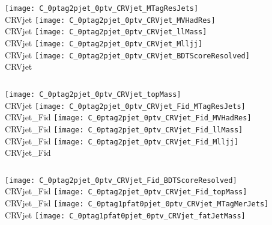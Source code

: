 \begin{frame}{}
  \begin{columns}[c]
    \centering\texttt{[image: C\_0ptag2pjet\_0ptv\_CRVjet\_MTagResJets]}\\
    CRVjet
    \centering\texttt{[image: C\_0ptag2pjet\_0ptv\_CRVjet\_MVHadRes]}\\
    CRVjet
    \centering\texttt{[image: C\_0ptag2pjet\_0ptv\_CRVjet\_llMass]}\\
    CRVjet
    \centering\texttt{[image: C\_0ptag2pjet\_0ptv\_CRVjet\_Mlljj]}\\
    CRVjet
    \centering\texttt{[image: C\_0ptag2pjet\_0ptv\_CRVjet\_BDTScoreResolved]}\\
    CRVjet
  \end{columns}
  \begin{columns}[c]
    \centering\texttt{[image: C\_0ptag2pjet\_0ptv\_CRVjet\_topMass]}\\
    CRVjet
    \centering\texttt{[image: C\_0ptag2pjet\_0ptv\_CRVjet\_Fid\_MTagResJets]}\\
    CRVjet\_Fid
    \centering\texttt{[image: C\_0ptag2pjet\_0ptv\_CRVjet\_Fid\_MVHadRes]}\\
    CRVjet\_Fid
    \centering\texttt{[image: C\_0ptag2pjet\_0ptv\_CRVjet\_Fid\_llMass]}\\
    CRVjet\_Fid
    \centering\texttt{[image: C\_0ptag2pjet\_0ptv\_CRVjet\_Fid\_Mlljj]}\\
    CRVjet\_Fid
  \end{columns}
  \begin{columns}[c]
    \centering\texttt{[image: C\_0ptag2pjet\_0ptv\_CRVjet\_Fid\_BDTScoreResolved]}\\
    CRVjet\_Fid
    \centering\texttt{[image: C\_0ptag2pjet\_0ptv\_CRVjet\_Fid\_topMass]}\\
    CRVjet\_Fid
    \centering\texttt{[image: C\_0ptag1pfat0pjet\_0ptv\_CRVjet\_MTagMerJets]}\\
    CRVjet 
    \centering\texttt{[image: C\_0ptag1pfat0pjet\_0ptv\_CRVjet\_fatJetMass]}\\

\end{columns}
\end{frame}
